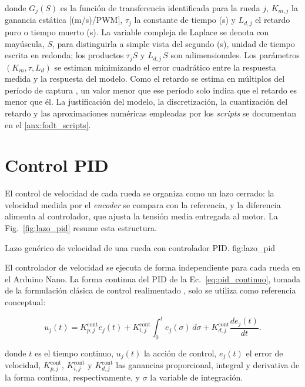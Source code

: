 \noindent donde $G_j(S)$ es la función de transferencia identificada para la
rueda $j$, $K_{m,j}$ la ganancia estática [(m/s)/PWM], $\tau_j$ la constante
de tiempo (s) y $L_{d,j}$ el retardo puro o tiempo muerto (s). La variable
compleja de Laplace se denota con mayúscula, $S$, para distinguirla a simple
vista del segundo (s), unidad de tiempo escrita en redonda; los productos
$\tau_j S$ y $L_{d,j}\,S$ son adimensionales.
Los parámetros $(K_m,\tau,L_d)$ se estiman minimizando el error
cuadrático entre la respuesta medida y la respuesta del modelo. Como el retardo
se estima en múltiplos del período de captura \citep[Sec.~2.4]{maxim2023fopdt},
un valor menor que ese período solo indica que el retardo es menor que él. La
justificación del modelo, la discretización, la cuantización del retardo y las
aproximaciones numéricas empleadas por los \textit{scripts} se documentan en el
\ref{anx:fodt_scripts}.

\section{Control PID}
\label{sec:pid}

El control de velocidad de cada rueda se organiza como un lazo cerrado: la
velocidad medida por el \textit{encoder} se compara con la referencia, y la diferencia
alimenta al controlador, que ajusta la tensión media entregada al motor. La
Fig.~\ref{fig:lazo_pid} resume esta estructura.

{Lazo genérico de velocidad de una rueda con controlador PID.}
{fig:lazo_pid}

El controlador de velocidad se ejecuta de forma independiente para cada rueda en el Arduino Nano. La forma continua del PID de la Ec.~\eqref{eq:pid_continuo}, tomada de la formulación clásica de control realimentado \citep[Sec.~3.2]{astrom2009controlpid}, solo se utiliza como referencia conceptual:

\begin{equation}
u_j(t)
=
K_{p,j}^{\mathrm{cont}}e_j(t)
+
K_{i,j}^{\mathrm{cont}}\int_0^t e_j(\sigma)\,d\sigma
+
K_{d,j}^{\mathrm{cont}}\frac{de_j(t)}{dt}.
\label{eq:pid_continuo}
\end{equation}

\noindent donde $t$ es el tiempo continuo, $u_j(t)$ la acción de control, $e_j(t)$ el error de velocidad, $K_{p,j}^{\mathrm{cont}}$, $K_{i,j}^{\mathrm{cont}}$ y $K_{d,j}^{\mathrm{cont}}$ las ganancias proporcional, integral y derivativa de la forma continua, respectivamente, y $\sigma$ la variable de integración.


